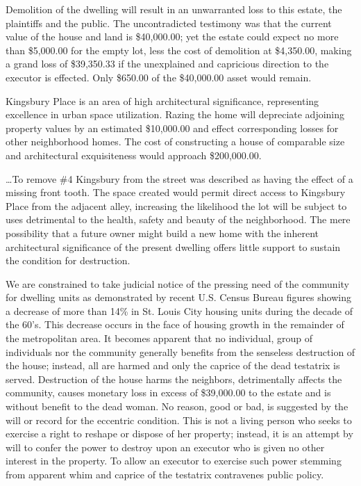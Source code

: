 Demolition of the dwelling will result in an unwarranted loss to this estate,
the plaintiffs and the public. The uncontradicted testimony was that the
current value of the house and land is \$40,000.00; yet the estate could expect
no more than \$5,000.00 for the empty lot, less the cost of demolition at
\$4,350.00, making a grand loss of \$39,350.33 if the unexplained and
capricious direction to the executor is effected. Only \$650.00 of the
\$40,000.00 asset would remain.

Kingsbury Place is an area of high architectural significance, representing
excellence in urban space utilization. Razing the home will depreciate
adjoining property values by an estimated \$10,000.00 and effect corresponding
losses for other neighborhood homes. The cost of constructing a house of
comparable size and architectural exquisiteness would approach \$200,000.00.

\ldots To remove \#4 Kingsbury from the street was described as having the
effect of a missing front tooth. The space created would permit direct access
to Kingsbury Place from the adjacent alley, increasing the likelihood the lot
will be subject to uses detrimental to the health, safety and beauty of the
neighborhood. The mere possibility that a future owner might build a new home
with the inherent architectural significance of the present dwelling offers
little support to sustain the condition for destruction.

We are constrained to take judicial notice of the pressing need of the community
for dwelling units as demonstrated by recent U.S. Census Bureau figures showing
a decrease of more than 14\% in St. Louis City housing units during the decade
of the 60's. This decrease occurs in the face of housing growth in the
remainder of the metropolitan area. It becomes apparent that no individual,
group of individuals nor the community generally benefits from the senseless
destruction of the house; instead, all are harmed and only the caprice of the
dead testatrix is served. Destruction of the house harms the neighbors,
detrimentally affects the community, causes monetary loss in excess of
\$39,000.00 to the estate and is without benefit to the dead woman. No reason,
good or bad, is suggested by the will or record for the eccentric condition.
This is not a living person who seeks to exercise a right to reshape or dispose
of her property; instead, it is an attempt by will to confer the power to
destroy upon an executor who is given no other interest in the property. To
allow an executor to exercise such power stemming from apparent whim and
caprice of the testatrix contravenes public policy.

